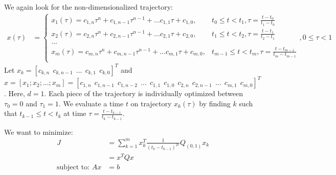 \documentclass[11pt]{article}
\begin{document}
We again look for the non-dimensionalized trajectory: 
\begin{align*}
x(\tau) &= 
\begin{cases}
    x_1 (\tau) = c_{1, n} \tau^n + c_{1, n-1} \tau^{n-1} + ... c_{1, 1} \tau + c_{1, 0}, & t_0 \le t < t_1, \tau = \frac{t-t_0}{t_1-t_0}  \\
    x_2 (\tau) = c_{2, n} \tau^n + c_{2, n-1} \tau^{n-1} + ... c_{2, 1} \tau + c_{2, 0}, & t_1 \le t < t_2, \tau = \frac{t-t_1}{t_2-t_1}  \\
    ... \\
    x_m (\tau) = c_{m, n} \tau^n + c_{m, n-1} \tau^{n-1} + ... c_{m, 1} \tau + c_{m, 0}, & t_{m-1} \le t < t_m, \tau = \frac{t-t_{m-1}}{t_m-t_{m-1}} \\
\end{cases},  0 \le \tau < 1
\end{align*} 
Let $x_k = [c_{k, n} \ \ c_{k, n-1} \ \ ... \ \ c_{k, 1} \ \ c_{k, 0}]^T$ and $x = [x_1; x_2; ...; x_m] = [c_{1, n} \ \ c_{1, n-1} \ \ c_{1, n-2} \ \ ... \ \ c_{1, 1} \ \ c_{1, 0} \ \ c_{2, n} \ \ c_{2, n-1} \ \ ... \ \ c_{m, 1} \ \ c_{m, 0} ]^T$. Here, $d = 1$. Each piece of the trajectory is individually optimized between $\tau_0 = 0$ and $\tau_1=1$. We evaluate a time $t$ on trajectory $x_k(\tau)$ by finding $k$ such that $t_{k-1} \le t < t_k$ at time $\tau = \frac{t-t_{k-1}}{t_k-t_{k-1}}$.  

\mbox{} \newline
We want to minimize:
\begin{align*}
J &=  \sum_{k=1}^{m} x_k^T \frac{1}{(t_k-t_{k-1})^{2r}} Q_{(0, 1)} x_k \\
&= x^T Q x \\
\text{subject to: } A x &=b
\end{align*}




%
\end{document}
